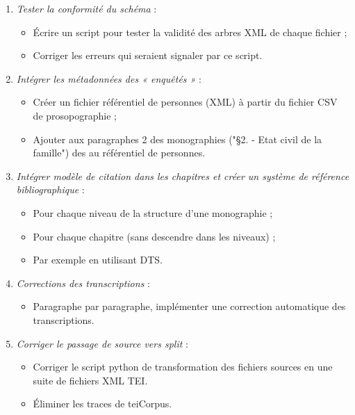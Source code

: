 \begin{enumerate}
    \item \textit{Tester la conformité du schéma} :
    \begin{itemize}
        \item  Écrire un script pour tester la validité des arbres XML de chaque fichier ;
        \item  Corriger les erreurs qui seraient signaler par ce script.
    \end{itemize}

    \item \textit{Intégrer les métadonnées des « enquêtés »} :
    \begin{itemize}
        \item  Créer un fichier référentiel de personnes (XML) à partir du fichier CSV de prosopographie ;
        \item  Ajouter aux paragraphes 2 des monographies ("§2. - Etat civil de la famille") des  au référentiel de personnes.
    \end{itemize}

    \item \textit{Intégrer modèle de citation dans les chapitres et créer un système de référence bibliographique} :
    \begin{itemize}
        \item  Pour chaque niveau de la structure d'une monographie  ;
        \item  Pour chaque chapitre (sans descendre dans les niveaux) ;
        \item  Par exemple en utilisant DTS.
    \end{itemize}

    \item \textit{Corrections des transcriptions} :
    \begin{itemize}
        \item  Paragraphe par paragraphe, implémenter une correction automatique des transcriptions.
    \end{itemize}

    \item \textit{Corriger le passage de source vers split} :
    \begin{itemize}
        \item  Corriger le script python de transformation des fichiers sources en une suite de fichiers XML TEI.
        \item  Éliminer les traces de teiCorpus.
    \end{itemize}


\end{enumerate}
